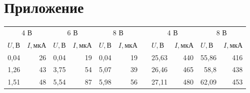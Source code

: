 \documentclass[a4paper,12pt]{article} %
\begin{document}
\section{Приложение}
\newpage
\begin{table}[]
\begin{tabular}{|rr|rr|rr|lrrll}
\cline{1-6} \cline{8-11}
\multicolumn{2}{|c|}{4 В}                                                  & \multicolumn{2}{c|}{6 В}                                                  & \multicolumn{2}{c|}{8 В}                                                  & \multicolumn{1}{l|}{} & \multicolumn{2}{c|}{4 В}                                                  & \multicolumn{2}{c|}{8 В}                                                  \\ \cline{1-6} \cline{8-11} 
\multicolumn{1}{|l|}{$U, \text{В}$} & \multicolumn{1}{l|}{$I, \text{мкА}$} & \multicolumn{1}{l|}{$U, \text{В}$} & \multicolumn{1}{l|}{$I, \text{мкА}$} & \multicolumn{1}{l|}{$U, \text{В}$} & \multicolumn{1}{l|}{$I, \text{мкА}$} & \multicolumn{1}{l|}{} & \multicolumn{1}{l|}{$U, \text{В}$} & \multicolumn{1}{l|}{$I, \text{мкА}$} & \multicolumn{1}{l|}{$U, \text{В}$} & \multicolumn{1}{l|}{$I, \text{мкА}$} \\ \cline{1-6} \cline{8-11} 
\multicolumn{1}{|r|}{0,04}          & 26                                   & \multicolumn{1}{r|}{0,04}          & 19                                   & \multicolumn{1}{r|}{0,04}          & 19                                   & \multicolumn{1}{l|}{} & \multicolumn{1}{r|}{25,63}         & \multicolumn{1}{r|}{440}             & \multicolumn{1}{r|}{55,86}         & \multicolumn{1}{r|}{416}             \\ \cline{1-6} \cline{8-11} 
\multicolumn{1}{|r|}{1,26}          & 43                                   & \multicolumn{1}{r|}{3,75}          & 54                                   & \multicolumn{1}{r|}{5,07}          & 39                                   & \multicolumn{1}{l|}{} & \multicolumn{1}{r|}{26,46}         & \multicolumn{1}{r|}{465}             & \multicolumn{1}{r|}{58,8}          & \multicolumn{1}{r|}{438}             \\ \cline{1-6} \cline{8-11} 
\multicolumn{1}{|r|}{1,51}          & 48                                   & \multicolumn{1}{r|}{5,54}          & 87                                   & \multicolumn{1}{r|}{5,98}          & 56                                   & \multicolumn{1}{l|}{} & \multicolumn{1}{r|}{27,11}         & \multicolumn{1}{r|}{480}             & \multicolumn{1}{r|}{62,09}         & \multicolumn{1}{r|}{453}             \\ \cline{1-6} \cline{8-11} 

\end{tabular}
\end{table}
\end{document}
